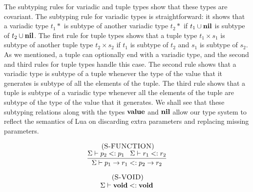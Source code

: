 The subtyping rules for variadic and tuple types show that
these types are covariant.
The subtyping rule for variadic types is straightforward:
it shows that a variadic type $t_{1}*$ is subtype of another
variadic type $t_{2}*$ if $t_{1} \cup \mathbf{nil}$ is subtype of
$t_{2} \cup \mathbf{nil}$.
The first rule for tuple types shows that a tuple type
$t_{1} \times s_{1}$ is subtype of another tuple type
$t_{2} \times s_{2}$ if $t_{1}$ is subtype of $t_{2}$
and $s_{1}$ is subtype of $s_{2}$.
As we mentioned, a tuple can optionally end with a variadic
type, and the second and third rules for tuple types handle
this case.
The second rule shows that a variadic type is subtype of
a tuple whenever the type of the value that it generates is subtype
of all the elements of the tuple.
The third rule shows that a tuple is subtype of a variadic
type whenever all the elements of the tuple are subtype of the
type of the value that it generates.
We shall see that these subtyping relations along with the
types $\mathbf{value}$ and $\mathbf{nil}$ allow our type system to reflect
the semantics of Lua on discarding extra parameters and
replacing missing parameters.

\[
\begin{array}{c}
\; (\textsc{S-FUNCTION})\\
\dfrac{\Sigma \vdash p_{2} <: p_{1} \;\;\;
       \Sigma \vdash r_{1} <: r_{2}}
      {\Sigma \vdash p_{1} \rightarrow r_{1} <: p_{2} \rightarrow r_{2}}
\end{array}
\]

\[
\begin{array}{c}
\; (\textsc{S-VOID})\\
\Sigma \vdash \mathbf{void} <: \mathbf{void}
\end{array}
\]


